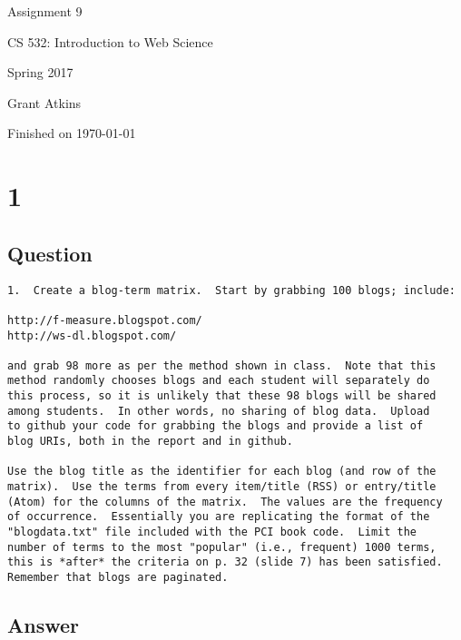 \documentclass[letterpaper,11pt]{article}
\begin{document}
\begin{titlepage}

\begin{center}

\Huge{Assignment 9}

\Large{CS 532:  Introduction to Web Science}

\Large{Spring 2017}

\Large{Grant Atkins}

\Large Finished on \today

\end{center}

\end{titlepage}

\newpage


\section*{1}

\subsection*{Question}

\begin{verbatim}
1.  Create a blog-term matrix.  Start by grabbing 100 blogs; include:

http://f-measure.blogspot.com/
http://ws-dl.blogspot.com/

and grab 98 more as per the method shown in class.  Note that this
method randomly chooses blogs and each student will separately do
this process, so it is unlikely that these 98 blogs will be shared
among students.  In other words, no sharing of blog data.  Upload
to github your code for grabbing the blogs and provide a list of
blog URIs, both in the report and in github.

Use the blog title as the identifier for each blog (and row of the
matrix).  Use the terms from every item/title (RSS) or entry/title
(Atom) for the columns of the matrix.  The values are the frequency
of occurrence.  Essentially you are replicating the format of the
"blogdata.txt" file included with the PCI book code.  Limit the
number of terms to the most "popular" (i.e., frequent) 1000 terms,
this is *after* the criteria on p. 32 (slide 7) has been satisfied.
Remember that blogs are paginated. 
\end{verbatim}

\clearpage
\subsection*{Answer}
\end{document}
